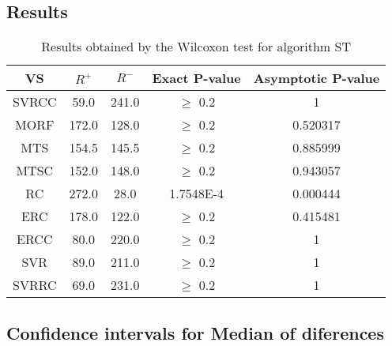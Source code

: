 \documentclass[a4paper,10pt]{article}
\begin{document}
\subsection{Results}

\begin{table}[!htp]
\centering\small
\begin{tabular}{
|c|c|c|c|c|}
\hline
 VS & $R^{+}$ & $R^{-}$ & Exact P-value & Asymptotic P-value \\ \hline 
SVRCC & 59.0 & 241.0 & $\geq$ 0.2 & 1\\ \hline 
MORF & 172.0 & 128.0 & $\geq$ 0.2 & 0.520317\\ \hline 
MTS & 154.5 & 145.5 & $\geq$ 0.2 & 0.885999\\ \hline 
MTSC & 152.0 & 148.0 & $\geq$ 0.2 & 0.943057\\ \hline 
RC & 272.0 & 28.0 & 1.7548E-4 & 0.000444\\ \hline 
ERC & 178.0 & 122.0 & $\geq$ 0.2 & 0.415481\\ \hline 
ERCC & 80.0 & 220.0 & $\geq$ 0.2 & 1\\ \hline 
SVR & 89.0 & 211.0 & $\geq$ 0.2 & 1\\ \hline 
SVRRC & 69.0 & 231.0 & $\geq$ 0.2 & 1\\ \hline 

\end{tabular}
\caption{Results obtained by the Wilcoxon test for algorithm ST}
\end{table}

\subsection{Confidence intervals for Median of diferences}
\end{document}
